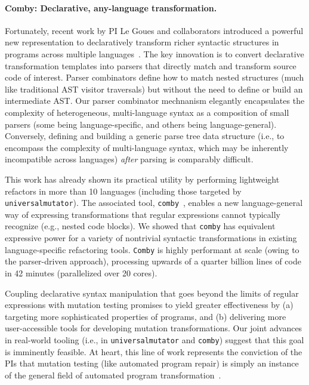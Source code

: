 \paragraph{Comby: Declarative, any-language transformation.} Fortunately, recent work by PI
Le Goues and collaborators introduced a powerful new representation to
declaratively transform richer syntactic structures in programs across multiple
languages~\cite{rvt-ppc}. The key innovation is to convert declarative
transformation templates into parsers that directly match and transform source
code of interest. Parser
combinators define how to match nested structures (much like traditional AST
visitor traversals) but without the need to define or build an intermediate AST.
Our parser combinator mechnanism elegantly encapsulates the complexity of
heterogeneous, multi-language syntax as a composition of small parsers (some
being language-specific, and others being language-general). Conversely, defining and
building a generic parse tree data structure (i.e., to encompass the complexity
of multi-language syntax, which may be inherently incompatible across languages)
\emph{after} parsing is comparably difficult.

This work has already shown its practical utility by performing lightweight
refactors in more than 10 languages (including those targeted by {\tt
  universalmutator}). The associated tool, {\tt comby}~\cite{comby-github},
enables a new language-general way of expressing transformations that regular
expressions cannot typically recognize (e.g., nested code blocks). We showed
that {\tt comby} has equivalent expressive power for a variety of nontrivial syntactic
transformations in existing language-specific refactoring tools. {\tt Comby} is
highly performant at scale (owing to the parser-driven approach), processing
upwards of a quarter billion lines of code in 42 minutes (parallelized over 20 cores).

Coupling declarative syntax manipulation that goes beyond the limits
of regular expressions with
mutation testing promises to yield greater effectiveness by (a) targeting more
sophisticated properties of programs, and (b) delivering more user-accessible
tools for developing mutation transformations. Our joint advances in
real-world tooling (i.e., in {\tt universalmutator} and {\tt comby}) suggest that
this goal is imminently feasible.  At heart, this line of work
represents the conviction of the PIs that mutation testing (like
automated program repair) is simply
an instance of the general field of automated program transformation~\cite{Ptransform}.

